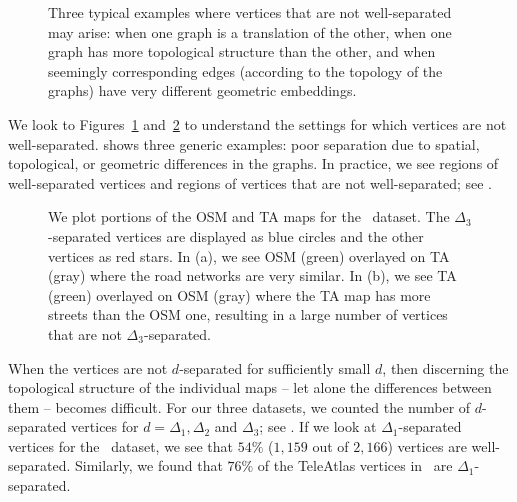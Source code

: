 \begin{figure}[htb]
    \centering
    \caption{Three typical examples where vertices that are not
    well-separated may arise: when one graph is a translation of the
    other, when one graph has more topological structure than the other, 
    and when
    seemingly corresponding edges (according to the topology of the graphs) have
    very different geometric embeddings.}
    \label{fig-badVertex}
\end{figure}
We look to Figures~\ref{fig-badVertex} and~\ref{fig-goodvsbad} to understand the
settings for which vertices are not well-separated.
 shows three
generic examples: poor separation due to spatial, topological, or geometric
differences in the graphs.
In practice, we see regions of well-separated vertices
and regions of vertices that are not well-separated; see .
  \addtocounter{footnote}{-1}
  \begin{figure}[t]
  \centering {}
  \hspace{.2in}
  \caption{We plot portions of the OSM and TA maps for
  the \asmall\ dataset\footnotemark.  The $\Delta_3$-separated
    vertices are displayed as blue circles and the other vertices as red stars.
  In (a), we see OSM
    (green) overlayed on TA (gray) where the road networks are very similar.  In
  (b), we see TA (green) overlayed on OSM
    (gray) where the TA map has more streets than the OSM one, resulting in a
  large number of vertices that are not $\Delta_3$-separated.
  }
  \label{fig-goodvsbad}
  \end{figure}

When the vertices are not $d$-separated for sufficiently small $d$, then
discerning the topological structure of the individual maps -- let alone the
differences between them -- becomes difficult.
For our three datasets, we counted the number of $d$-separated vertices for
$d=\Delta_1, \Delta_2$ and $\Delta_3$; see
.  If we look at $\Delta_1$-separated vertices for the
\bsmall\ dataset, we see that $54\%$ ($1,159$ out
of $2,166$) vertices are well-separated.  Similarly, we found that $76\%$ of the
TeleAtlas vertices in \bsmall\ are
$\Delta_1$-separated.

